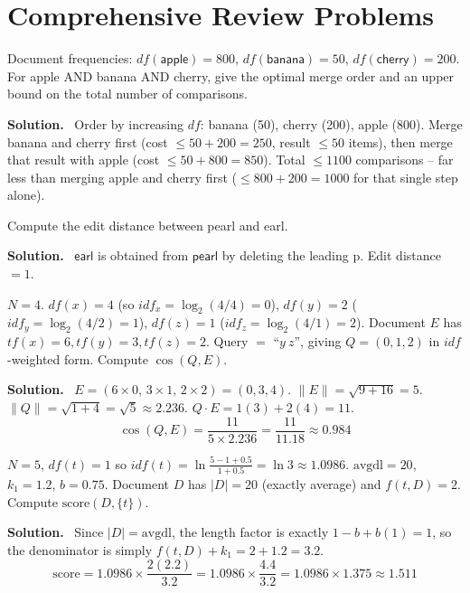 \documentclass[11pt, a4paper]{article}
\newcommand{\Solution}{\medskip\noindent\textbf{\color{exgreen}Solution.}\ }
\begin{document}
\section{Comprehensive Review Problems}

\begin{exercisebox}
Document frequencies: $df(\textsf{apple})=800$, $df(\textsf{banana})=50$, $df(\textsf{cherry})=200$. For \textsf{apple AND banana AND cherry}, give the optimal merge order and an upper bound on the total number of comparisons.
\end{exercisebox}
\Solution
Order by increasing $df$: \textsf{banana} (50), \textsf{cherry} (200), \textsf{apple} (800). Merge \textsf{banana} and \textsf{cherry} first (cost $\le 50+200=250$, result $\le50$ items), then merge that result with \textsf{apple} (cost $\le 50+800=850$). Total $\le 1100$ comparisons -- far less than merging \textsf{apple} and \textsf{cherry} first ($\le 800+200=1000$ for that single step alone).

\begin{exercisebox}
Compute the edit distance between \textsf{pearl} and \textsf{earl}.
\end{exercisebox}
\Solution
$\textsf{earl}$ is obtained from $\textsf{pearl}$ by deleting the leading \textsf{p}. Edit distance $=1$.

\begin{exercisebox}
$N=4$. $df(x)=4$ (so $idf_x=\log_2(4/4)=0$), $df(y)=2$ ($idf_y=\log_2(4/2)=1$), $df(z)=1$ ($idf_z=\log_2(4/1)=2$). Document $E$ has $tf(x)=6,tf(y)=3,tf(z)=2$. Query $=$ ``$y\ z$'', giving $Q=(0,1,2)$ in $idf$-weighted form. Compute $\cos(Q,E)$.
\end{exercisebox}
\Solution
$E = (6\times0,\,3\times1,\,2\times2) = (0,3,4)$. $\lVert E\rVert=\sqrt{9+16}=5$. $\lVert Q\rVert=\sqrt{1+4}=\sqrt5\approx2.236$. $Q\cdot E = 1(3)+2(4)=11$.
\[
\cos(Q,E) = \frac{11}{5\times2.236} = \frac{11}{11.18} \approx 0.984
\]

\begin{exercisebox}
$N=5$, $df(t)=1$ so $idf(t)=\ln\frac{5-1+0.5}{1+0.5}=\ln 3\approx1.0986$. $\text{avgdl}=20$, $k_1=1.2$, $b=0.75$. Document $D$ has $|D|=20$ (exactly average) and $f(t,D)=2$. Compute $\text{score}(D,\{t\})$.
\end{exercisebox}
\Solution
Since $|D|=\text{avgdl}$, the length factor is exactly $1-b+b(1)=1$, so the denominator is simply $f(t,D)+k_1 = 2+1.2=3.2$.
\[
\text{score} = 1.0986\times\frac{2(2.2)}{3.2} = 1.0986\times\frac{4.4}{3.2} = 1.0986\times1.375 \approx 1.511
\]
\end{document}

